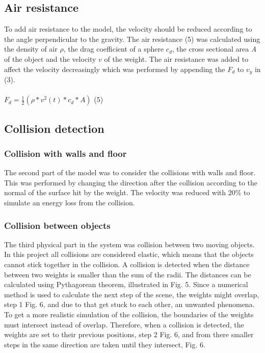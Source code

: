 \documentclass[a4paper,12pt,twoside,english]{article}
\begin{document}
 
\subsection{Air resistance}
To add air resistance to the model, the velocity should be reduced according to the angle perpendicular to the gravity. The air resistance (5) was calculated using the density of air ${\rho}$, the drag coefficient of a sphere $c_d$, the cross sectional area {\itshape A}  of the object and the velocity $v$ of the weight.
The air resistance was added to affect the velocity decreasingly which was performed by appending the $F_d$ to $v_y$ in (3).\\ \\
$F_d = \frac{1}{2}( \rho * v^2(t) * c_{d} * A)$ \hfill (5) 

\subsection{Collision detection}
\subsubsection{Collision with walls and floor}
The second part of the model was to consider the collisions with walls and floor. This was performed by changing the direction after the collision according to the normal of the surface hit by the weight. The velocity was reduced with 20\%  to simulate an energy loss from the collision.

\subsubsection{Collision between objects}
The third physical part in the system was collision between two moving objects. In this project all collisions are considered elastic, which means that the objects cannot stick together in the collision.
A collision is detected when the distance between two weights is smaller than the sum of the radii. The distances can be calculated using Pythagorean theorem, illustrated in Fig. 5. 
Since a numerical method is used to calculate the next step of the scene, the weights might overlap, step 1 Fig. 6, and due to that get stuck to each other, an unwanted phenomena. To get a more realistic simulation of the collision, the boundaries of the weights must intersect instead of overlap. Therefore, when a collision is detected, the weights are set to their previous positions, step 2 Fig. 6, and from there smaller steps in the same direction are taken until they intersect, Fig. 6. 
\end{document}
